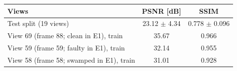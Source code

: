 \begin{tabular}{lcc}
\toprule
Views & PSNR [dB] & SSIM \\
\midrule
Test split (19 views) & 23.12 $\pm$ 4.34 & 0.778 $\pm$ 0.096 \\
View 69 (frame 88; clean in E1), train & 35.67 & 0.966 \\
View 59 (frame 59; faulty in E1), train & 32.14 & 0.955 \\
View 58 (frame 58; swamped in E1), train & 31.01 & 0.928 \\
\bottomrule
\end{tabular}

